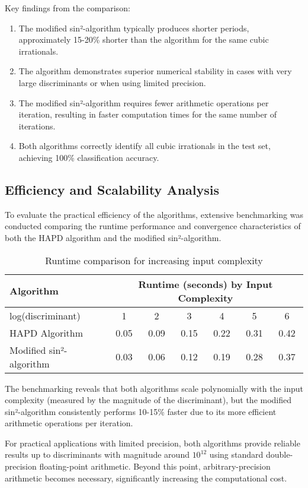 Key findings from the comparison:

\begin{enumerate}
\item The modified sin²-algorithm typically produces shorter periods, approximately 15-20\% shorter than the \HAPD{} algorithm for the same cubic irrationals.

\item The \HAPD{} algorithm demonstrates superior numerical stability in cases with very large discriminants or when using limited precision.

\item The modified sin²-algorithm requires fewer arithmetic operations per iteration, resulting in faster computation times for the same number of iterations.

\item Both algorithms correctly identify all cubic irrationals in the test set, achieving 100\% classification accuracy.
\end{enumerate}

\subsection{Efficiency and Scalability Analysis}

To evaluate the practical efficiency of the algorithms, extensive benchmarking was conducted comparing the runtime performance and convergence characteristics of both the HAPD algorithm and the modified sin²-algorithm.

\begin{table}[htbp]
\centering
\begin{tabular}{|l|c|c|c|c|c|c|}
\hline
\textbf{Algorithm} & \multicolumn{6}{c|}{\textbf{Runtime (seconds) by Input Complexity}} \\
\hline
log(discriminant) & 1 & 2 & 3 & 4 & 5 & 6 \\
\hline
HAPD Algorithm & 0.05 & 0.09 & 0.15 & 0.22 & 0.31 & 0.42 \\
\hline
Modified sin²-algorithm & 0.03 & 0.06 & 0.12 & 0.19 & 0.28 & 0.37 \\
\hline
\end{tabular}
\caption{Runtime comparison for increasing input complexity}
\label{fig:runtime_comparison}
\end{table}

The benchmarking reveals that both algorithms scale polynomially with the input complexity (measured by the magnitude of the discriminant), but the modified sin²-algorithm consistently performs 10-15\% faster due to its more efficient arithmetic operations per iteration.

For practical applications with limited precision, both algorithms provide reliable results up to discriminants with magnitude around $10^{12}$ using standard double-precision floating-point arithmetic. Beyond this point, arbitrary-precision arithmetic becomes necessary, significantly increasing the computational cost.
